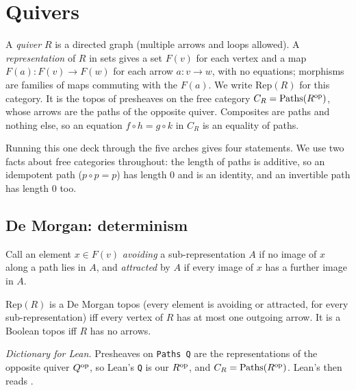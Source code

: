 \section{Quivers}\label{sec:machines}

A \emph{quiver} $R$ is a directed graph (multiple arrows and loops allowed). A \emph{representation} of $R$ in sets gives a set $F(v)$ for each vertex and a map $F(a) : F(v)\to F(w)$ for each arrow $a : v\to w$, with no equations; morphisms are families of maps commuting with the $F(a)$. We write $\mathrm{Rep}(R)$ for this category. It is the topos of presheaves on the free category $C_R = \mathrm{Paths}(R^{\mathrm{op}})$, whose arrows are the paths of the opposite quiver. Composites are paths and nothing else, so an equation $f\circ h = g\circ k$ in $C_R$ is an equality of paths.

Running this one deck through the five arches gives four statements. We use two facts about free categories throughout: the length of paths is additive, so an idempotent path ($p\circ p = p$) has length $0$ and is an identity, and an invertible path has length $0$ too.

\subsection{De Morgan: determinism}

Call an element $x\in F(v)$ \emph{avoiding} a sub-representation $A$ if no image of $x$ along a path lies in $A$, and \emph{attracted} by $A$ if every image of $x$ has a further image in $A$.

\begin{theorem}\label{th:quivers}
$\mathrm{Rep}(R)$ is a De Morgan topos (every element is avoiding or attracted, for every sub-representation) iff every vertex of $R$ has at most one outgoing arrow. It is a Boolean topos iff $R$ has no arrows.
\end{theorem}

\emph{Dictionary for Lean.} Presheaves on \texttt{Paths Q} are the representations of the opposite quiver $Q^{\mathrm{op}}$, so Lean's \texttt{Q} is our $R^{\mathrm{op}}$, and $C_R = \mathrm{Paths}(R^{\mathrm{op}})$. Lean's  then reads .

